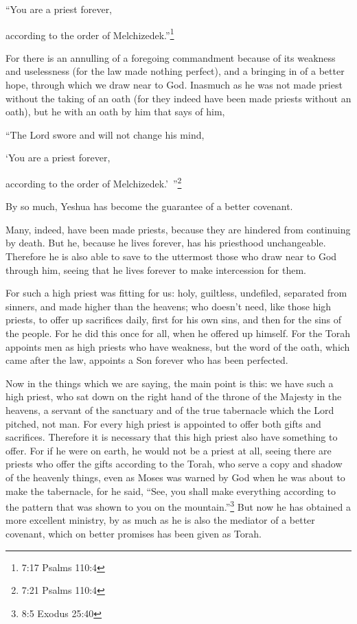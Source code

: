 “You are a priest forever,

according to the order of Melchizedek.”\footnote{7:17 Psalms 110:4}

\myverse{}For there is an annulling of a foregoing commandment because
of its weakness and uselessness
\myverse{}(for the law made nothing perfect), and a bringing in of a better hope, through
which we draw near to God.
\myverse{}Inasmuch as he was not made priest without the taking of an oath
\myverse{}(for they indeed have been made priests without an oath), but he with an oath
by him that says of him,

“The Lord swore and will not change his mind,

‘You are a priest forever,

according to the order of Melchizedek.’ ”\footnote{7:21 Psalms 110:4}

\myverse{}By so much, Yeshua has become the guarantee of a better covenant.

\myverse{}Many, indeed, have been made priests, because they are hindered
from continuing by death.
\myverse{}But he, because he lives forever, has his priesthood unchangeable.
\myverse{}Therefore he is also able to save to the uttermost those who draw near to
God through him, seeing that he lives forever to make intercession for them.

\myverse{}For such a high priest was fitting for us: holy, guiltless, undefiled,
separated from sinners, and made higher than the heavens;
\myverse{}who doesn’t need, like those high priests, to offer up sacrifices daily, first
for his own sins, and then for the sins of the people. For he did this once for all, when he offered up
himself.
\myverse{}For the Torah appoints men as high priests who have weakness, but the word
of the oath, which came after the law, appoints a Son forever who has been perfected.


\mychapter{} \myverse*{}Now in the things which we are saying, the main point is this:
we have such a high priest, who sat down on the right hand of the throne of the Majesty in the heavens,
\myverse{}a servant of the sanctuary and of the true tabernacle which the Lord pitched,
not man.
\myverse{}For every high priest is appointed to offer both gifts and sacrifices. Therefore
it is necessary that this high priest also have something to offer.
\myverse{}For if he were on earth, he would not be a priest at all, seeing there are priests
who offer the gifts according to the Torah,
\myverse{}who serve a copy and shadow of the heavenly things, even as Moses was warned
by God when he was about to make the tabernacle, for he said, “See, you shall make everything according
to the pattern that was shown to you on the mountain.”\footnote{8:5 Exodus 25:40}
\myverse{}But now he has obtained a more excellent ministry, by as much as he is also
the mediator of a better covenant, which on better promises has been given as Torah.

